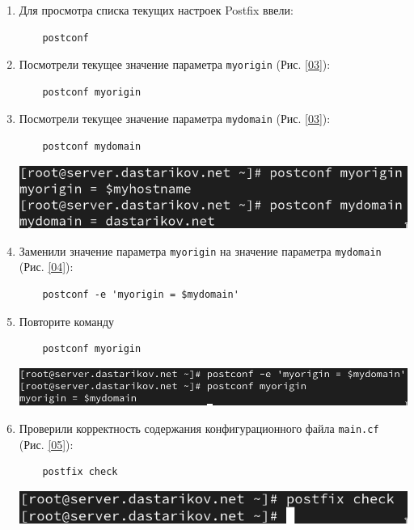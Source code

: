 \begin{enumerate}
\item Для просмотра списка текущих настроек Postfix ввели:
  \begin{verbatim}
    postconf
  \end{verbatim}
\item Посмотрели текущее значение параметра \texttt{myorigin} (Рис. \ref{03}):
  \begin{verbatim}
    postconf myorigin
  \end{verbatim}
\item Посмотрели текущее значение параметра \texttt{mydomain} (Рис. \ref{03}):
  \begin{verbatim}
    postconf mydomain
  \end{verbatim}

\begin{center}
    \centering
    \includegraphics[width=\textwidth]{../images/image03.png}
    \label{03}
\end{center}

\item Заменили значение параметра \texttt{myorigin} на значение параметра \texttt{mydomain} (Рис. \ref{04}):
  \begin{verbatim}
    postconf -e 'myorigin = $mydomain'
  \end{verbatim}
\item Повторите команду
  \begin{verbatim}
    postconf myorigin
  \end{verbatim}

\begin{center}
    \centering
    \includegraphics[width=\textwidth]{../images/image04.png}
    \label{04}
\end{center}

\item Проверили корректность содержания конфигурационного файла \texttt{main.cf} (Рис. \ref{05}):
  \begin{verbatim}
    postfix check
  \end{verbatim}
\begin{center}
    \centering
    \includegraphics[width=\textwidth]{../images/image05.png}
    \label{05}
\end{center}


\end{enumerate}
